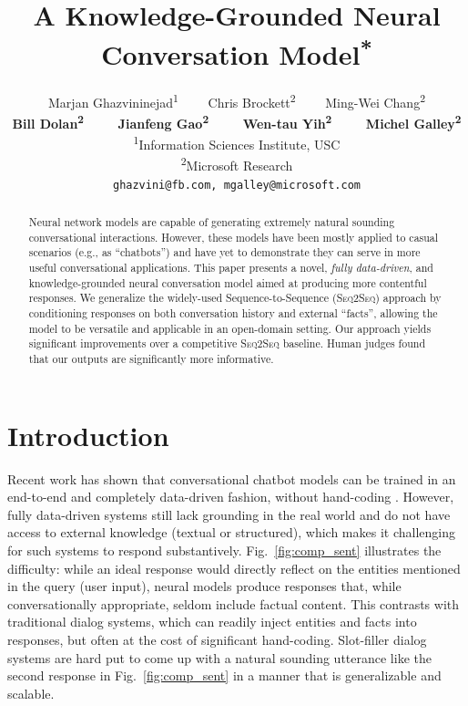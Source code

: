 \documentclass[letterpaper]{article}
\title{A Knowledge-Grounded Neural Conversation Model\textsuperscript{*}}
\author{Marjan Ghazvininejad\textsuperscript{1{\scriptsize \raisebox{1pt}{$\dagger$}}}~~~~
Chris Brockett\textsuperscript{2}~~~~
Ming-Wei Chang\textsuperscript{2{\scriptsize \raisebox{1pt}{$\ddagger$}}}\\
{\bf \Large
Bill Dolan\textsuperscript{2}~~~~
Jianfeng Gao\textsuperscript{2}~~~~
Wen-tau Yih\textsuperscript{2{\scriptsize \raisebox{1pt}{\S}}}~~~~
Michel Galley\textsuperscript{2}}\\
\textsuperscript{1}Information Sciences Institute, USC\\
\textsuperscript{2}Microsoft Research\\
{\tt ghazvini@fb.com, mgalley@microsoft.com}}
\begin{document}
\maketitle

\newcommand{\bleu}{{{\sc BLEU}}\xspace}
\newcommand{\sts}{{{\textsc{Seq2Seq}}}\xspace}
\newcommand{\MTask}{{{\textsc{MTask}}}\xspace}
\newcommand{\MTaskF}{{{\textsc{MTask-F}}}\xspace}
\newcommand{\MTaskR}{{{\textsc{MTask-R}}}\xspace}
\newcommand{\MTaskRF}{{{\textsc{MTask-RF}}}\xspace}
\newcommand\convs[1]{{\bf {#1}}}
\newcommand\slot[1]{{\it {#1}}}

\begin{abstract}
Neural network models are capable of generating extremely natural
sounding conversational interactions.  However, these models have been
mostly applied to casual scenarios (e.g., as ``chatbots'') and have
yet to demonstrate they can serve in more useful conversational
applications.  This paper presents a novel, {\it fully data-driven},
and knowledge-grounded neural conversation model aimed at producing
more contentful responses.  We generalize the widely-used
Sequence-to-Sequence (\sts) approach by conditioning responses on both
conversation history and external ``facts'', allowing the model to be
versatile and applicable in an open-domain setting.  Our approach
yields significant improvements over a competitive \sts baseline.
Human judges found that our outputs are significantly more
informative.
\end{abstract}

\section{Introduction}

Recent work has shown that conversational chatbot models can be trained in an end-to-end and completely data-driven fashion, without
hand-coding \cite[{\it inter alia}]{ritter2011data,sordoni2015,shang2015neural,vinyals2015neural,serban2015hierarchical}.
However, fully data-driven systems still lack grounding in the real world and do not have access to external knowledge (textual or structured), which makes it challenging for such systems to respond substantively.
Fig.~\ref{fig:comp_sent} illustrates the difficulty: while an ideal response would  directly reflect on the entities mentioned in the query (user input), neural models produce responses that, while conversationally appropriate,
seldom include factual content.
This contrasts with traditional dialog systems, which can readily inject entities and facts into responses, but often at the cost of significant hand-coding.
Slot-filler dialog systems are hard put to come up with a natural sounding utterance like the second response in Fig.~\ref{fig:comp_sent} in a manner that is generalizable and scalable.
\end{document}
